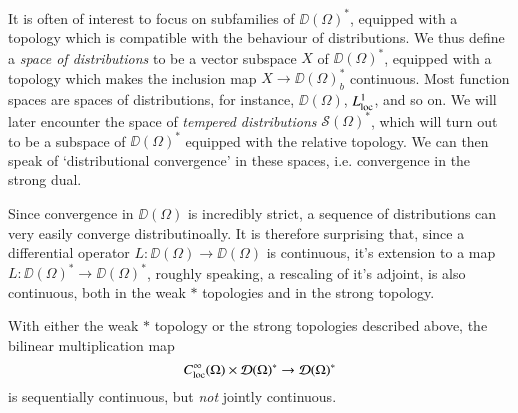 It is often of interest to focus on subfamilies of $\DD(\Omega)^*$, equipped with a topology which is compatible with the behaviour of distributions. We thus define a \emph{space of distributions} to be a vector subspace $X$ of $\DD(\Omega)^*$, equipped with a topology which makes the inclusion map $X \to \DD(\Omega)^*_b$ continuous. Most function spaces are spaces of distributions, for instance, $\DD(\Omega)$, $L^1_{\text{loc}}$, and so on. We will later encounter the space of \emph{tempered distributions} $\mathcal{S}(\Omega)^*$, which will turn out to be a subspace of $\DD(\Omega)^*$ equipped with the relative topology. We can then speak of `distributional convergence' in these spaces, i.e. convergence in the strong dual.

Since convergence in $\DD(\Omega)$ is incredibly strict, a sequence of distributions can very easily converge distributinoally. It is therefore surprising that, since a differential operator $L: \DD(\Omega) \to \DD(\Omega)$ is continuous, it's extension to a map $L: \DD(\Omega)^* \to \DD(\Omega)^*$, roughly speaking, a rescaling of it's adjoint, is also continuous, both in the weak $*$ topologies and in the strong topology.

With either the weak $*$ topology or the strong topologies described above, the bilinear multiplication map
%
\[ C^\infty_{\text{loc}}(\Omega) \times \operatorname{\mathcal{D}}(\Omega)^* \to \operatorname{\mathcal{D}}(\Omega)^* \]
%
is sequentially continuous, but \emph{not} jointly continuous.



